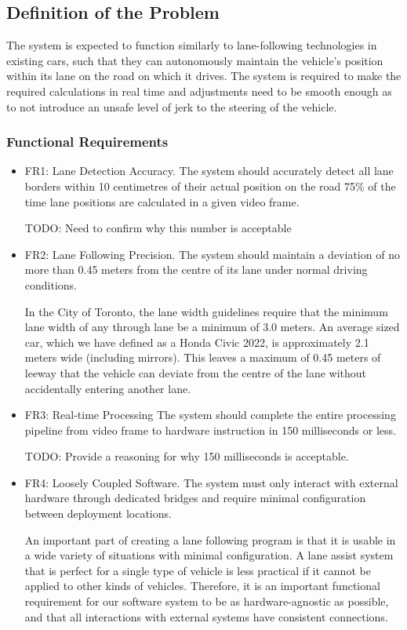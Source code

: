 \documentclass[titlepage,draft]{article}
\begin{document}
\subsection{Definition of the Problem}
The system is expected to function similarly to lane-following technologies in existing cars, such that they can autonomously maintain the vehicle's position within its lane on the road on which it drives. The system is required to make the required calculations in real time and adjustments need to be smooth enough as to not introduce an unsafe level of jerk to the steering of the vehicle.


\subsubsection{Functional Requirements}
\begin{itemize}
	\item  FR1: Lane Detection Accuracy. The system should accurately detect all lane borders within 10 centimetres of their actual position on the road 75\% of the time lane positions are calculated in a given video frame.

	      TODO: Need to confirm why this number is acceptable

	\item FR2: Lane Following Precision. The system should maintain a deviation of no more than 0.45 meters from the centre of its lane under normal driving conditions.

	      In the City of Toronto, the lane width guidelines require that the minimum lane width of any through lane be a minimum
	      of 3.0 meters. \cite{LaneWidthsGuideline}
	      An average sized car, which we have defined as a Honda Civic 2022, is approximately 2.1 meters wide (including
	      mirrors). \cite{HondaCivicSpecs}
	      This leaves a maximum of 0.45 meters of leeway that the vehicle can deviate from the centre of the lane without
	      accidentally entering another lane.

	\item FR3: Real-time Processing
	      The system should complete the entire processing pipeline from video frame to hardware instruction in 150 milliseconds or less.

	      TODO: Provide a reasoning for why 150 milliseconds is acceptable.


	\item FR4: Loosely Coupled Software. The system must only interact with external hardware through dedicated bridges and require minimal configuration between deployment locations.

	      An important part of creating a lane following program is that it is usable in a wide variety of situations with minimal configuration. A lane assist system that is perfect for a single type of vehicle is less practical if it cannot be applied to other kinds of vehicles. Therefore, it is an important functional requirement for our software system to be as hardware-agnostic as possible, and that all interactions with external systems have consistent connections.

\end{itemize}
\end{document}
